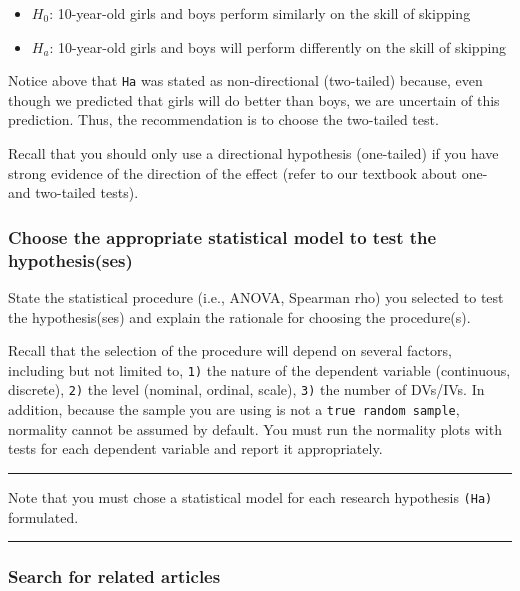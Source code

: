 \documentclass[
]{article}
\providecommand{\tightlist}{%
  \setlength{\itemsep}{0pt}\setlength{\parskip}{0pt}}
\begin{document}
\begin{itemize}
\tightlist
\item
  \(H_0\): 10-year-old girls and boys perform similarly on the skill of skipping
\item
  \(H_a\): 10-year-old girls and boys will perform differently on the skill of skipping
\end{itemize}

Notice above that \texttt{Ha} was stated as non-directional (two-tailed) because, even though we predicted that girls will do better than boys, we are uncertain of this prediction. Thus, the recommendation is to choose the two-tailed test.

Recall that you should only use a directional hypothesis (one-tailed) if you have strong evidence of the direction of the effect (refer to our textbook about one- and two-tailed tests).

\hypertarget{choose-the-appropriate-statistical-model-to-test-the-hypothesisses}{%
\subsubsection{Choose the appropriate statistical model to test the hypothesis(ses)}\label{choose-the-appropriate-statistical-model-to-test-the-hypothesisses}}

State the statistical procedure (i.e., ANOVA, Spearman rho) you selected to test the hypothesis(ses) and explain the rationale for choosing the procedure(s).

Recall that the selection of the procedure will depend on several factors, including but not limited to, \texttt{1)} the nature of the dependent variable (continuous, discrete), \texttt{2)} the level (nominal, ordinal, scale), \texttt{3)} the number of DVs/IVs. In addition, because the sample you are using is not a \texttt{true\ random\ sample}, normality cannot be assumed by default. You must run the normality plots with tests for each dependent variable and report it appropriately.

\begin{center}\rule{0.5\linewidth}{0.5pt}\end{center}

Note that you must chose a statistical model for each research hypothesis \texttt{(Ha)} formulated.

\begin{center}\rule{0.5\linewidth}{0.5pt}\end{center}

\hypertarget{articles}{%
\subsubsection{Search for related articles}\label{articles}}
\end{document}
